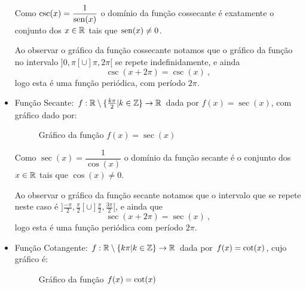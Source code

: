 \begin{itemize}
  Como $\csc(x)= \dfrac{1}{\operatorname{sen}(x)}$ o domínio da função cossecante é exatamente o conjunto dos $x \in \mathbb{R}$ tais que $\operatorname{sen}(x) \neq 0$.

  Ao observar o gráfico da função cossecante notamos que o gráfico da função no intervalo $]0, \pi[ \cup ] \pi, 2 \pi[$ se repete indefinidamente, e ainda
\begin{equation}
\csc(x + 2\pi)= \csc(x) \ , 
\end{equation}
  logo esta é uma função periódica, com período $2\pi$.

  \item Função Secante: $f: \mathbb{R} \setminus \{\frac{k\pi}{2} | k \in \mathbb{Z}\} \rightarrow \mathbb{R}$ dada por $f(x)= \sec(x)$, com gráfico dado por:

  \begin{figure}[H]
  \centering
    \caption{Gráfico da função $f(x)= \sec(x)$}
  \end{figure}

  Como $\sec(x)= \dfrac{1}{\cos (x)}$ o domínio da função secante é o conjunto dos $x \in \mathbb{R}$ tais que $\cos(x) \neq 0$.

  Ao observar o gráfico da função secante notamos que o intervalo que se repete neste caso é $]\frac{-\pi}{2}, \frac{\pi}{2}[ \cup ] \frac{\pi}{2}, \frac{3\pi}{2}[$, e ainda que
\begin{equation}
\sec(x + 2\pi)= \sec(x) \ ,
\end{equation}
  logo esta é uma função periódica com período $2\pi$.

  \item Função Cotangente: $f: \mathbb{R} \setminus \{ k\pi | k \in \mathbb{Z}\} \rightarrow \mathbb{R}$ dada por $f(x)= \operatorname{cot}(x)$, cujo gráfico é:

  \begin{figure}[H]
  \centering
    \caption{Gráfico da função $f(x)= \operatorname{cot}(x)$}
  \end{figure}


\end{itemize}
